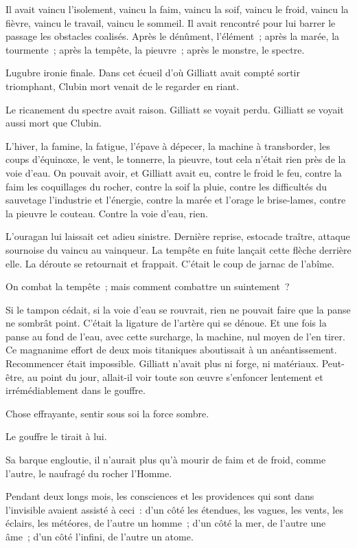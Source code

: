\documentclass[french,twoside]{book} %
\begin{document}
Il avait vaincu l’isolement, vaincu la faim, vaincu la soif, vaincu le froid, vaincu la fièvre, vaincu le travail, vaincu le sommeil. Il avait rencontré pour lui barrer le passage les obstacles coalisés. Après le dénûment, l’élément ; après la marée, la tourmente ; après la tempête, la pieuvre ; après le monstre, le spectre.\par
Lugubre ironie finale. Dans cet écueil d’où Gilliatt avait compté sortir triomphant, Clubin mort venait de le regarder en riant.\par
Le ricanement du spectre avait raison. Gilliatt se voyait perdu. Gilliatt se voyait aussi mort que Clubin.\par
L’hiver, la famine, la fatigue, l’épave à dépecer, la  machine à transborder, les coups d’équinoxe, le vent, le tonnerre, la pieuvre, tout cela n’était rien près de la voie d’eau. On pouvait avoir, et Gilliatt avait eu, contre le froid le feu, contre la faim les coquillages du rocher, contre la soif la pluie, contre les difficultés du sauvetage l’industrie et l’énergie, contre la marée et l’orage le brise-lames, contre la pieuvre le couteau. Contre la voie d’eau, rien.\par
L’ouragan lui laissait cet adieu sinistre. Dernière reprise, estocade traître, attaque sournoise du vaincu au vainqueur. La tempête en fuite lançait cette flèche derrière elle. La déroute se retournait et frappait. C’était le coup de jarnac de l’abîme.\par
On combat la tempête ; mais comment combattre un suintement ?\par
Si le tampon cédait, si la voie d’eau se rouvrait, rien ne pouvait faire que la panse ne sombrât point. C’était la ligature de l’artère qui se dénoue. Et une fois la panse au fond de l’eau, avec cette surcharge, la machine, nul moyen de l’en tirer. Ce magnanime effort de deux mois titaniques aboutissait à un anéantissement. Recommencer était impossible. Gilliatt n’avait plus ni forge, ni matériaux. Peut-être, au point du jour, allait-il voir toute son œuvre s’enfoncer lentement et irrémédiablement dans le gouffre.\par
Chose effrayante, sentir sous soi la force sombre.\par
Le gouffre le tirait à lui.\par
Sa barque engloutie, il n’aurait plus qu’à mourir de faim et de froid, comme l’autre, le naufragé du rocher l’Homme.\par
 Pendant deux longs mois, les consciences et les providences qui sont dans l’invisible avaient assisté à ceci : d’un côté les étendues, les vagues, les vents, les éclairs, les météores, de l’autre un homme ; d’un côté la mer, de l’autre une âme ; d’un côté l’infini, de l’autre un atome.\par
\end{document}
